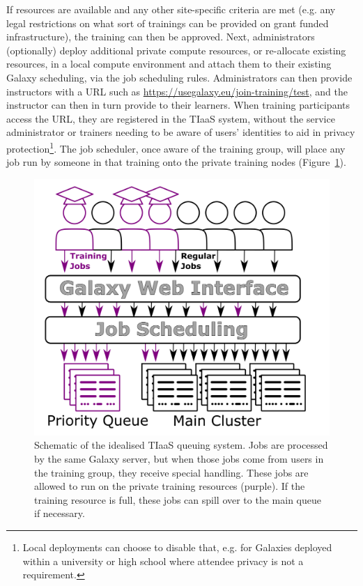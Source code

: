 \documentclass[a4paper,num-refs]{oup-contemporary}
\begin{document}
If resources are available and any other site-specific criteria are met (e.g. any legal restrictions on what sort of trainings can be provided on grant funded infrastructure), the training can then be approved. Next, administrators (optionally) deploy additional private compute resources, or re-allocate existing resources, in a local compute environment and attach them to their existing Galaxy scheduling, via the job scheduling rules. Administrators can then provide instructors with a URL such as \url{https://usegalaxy.eu/join-training/test}, and the instructor can then in turn provide to their learners. When training participants access the URL, they are registered in the TIaaS system, without the service administrator or trainers needing to be aware of users' identities to aid in privacy protection\footnote{Local deployments can choose to disable that, e.g. for Galaxies deployed within a university or high school where attendee privacy is not a requirement.}. The job scheduler, once aware of the training group, will place any job run by someone in that training onto the private training nodes (Figure~\ref{figure:queue}).

\begin{figure}[bt!]
\centering
\includegraphics[width=\linewidth]{images/rules.png}
\caption{Schematic of the idealised TIaaS queuing system. Jobs are processed by the same Galaxy server, but when those jobs come from users in the training group, they receive special handling. These jobs are allowed to run on the private training resources (purple). If the training resource is full, these jobs can spill over to the main queue if necessary.}\label{figure:queue}
\end{figure}
\end{document}
